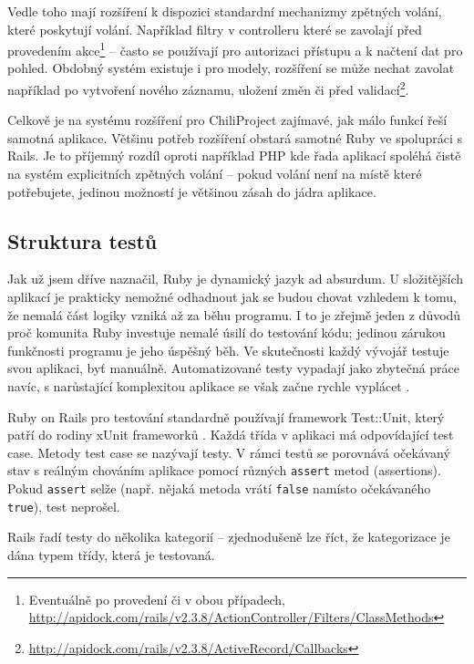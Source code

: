 \documentclass[thesis=B,czech]{FITthesis}[2012/05/02]
\begin{document}
Vedle toho mají rozšíření k dispozici standardní mechanizmy zpětných
volání, které poskytují volání. Například filtry v controlleru které se
zavolají před provedením akce\footnote{Eventuálně po provedení či v obou
  případech,
  \url{http://apidock.com/rails/v2.3.8/ActionController/Filters/ClassMethods}}
-- často se používají pro autorizaci přístupu a k načtení dat pro
pohled. Obdobný systém existuje i pro modely, rozšíření se může nechat
zavolat například po vytvoření nového záznamu, uložení změn či před
validací\footnote{\url{http://apidock.com/rails/v2.3.8/ActiveRecord/Callbacks}}.

Celkově je na systému rozšíření pro ChiliProject zajímavé, jak málo
funkcí řeší samotná aplikace. Většinu potřeb rozšíření obstará samotné
Ruby ve spolupráci s Rails. Je to příjemný rozdíl oproti například PHP
kde řada aplikací spoléhá čistě na systém explicitních zpětných volání
-- pokud volání není na místě které potřebujete, jedinou možností je
většinou zásah do jádra aplikace.

\subsection{Struktura testů}

\label{sec:rails_tests}

Jak už jsem dříve naznačil, Ruby je dynamický jazyk ad absurdum.
U složitějších aplikací je prakticky nemožné odhadnout jak se budou chovat
vzhledem k tomu, že nemalá část logiky vzniká až za běhu programu. I to
je zřejmě jeden z důvodů proč komunita Ruby investuje nemalé úsilí do
testování kódu; jedinou zárukou funkčnosti programu je jeho úspěšný běh.
Ve skutečnosti každý vývojář testuje svou aplikaci, byť manuálně.
Automatizované testy vypadají jako zbytečná práce navíc, s narůstající
komplexitou aplikace se však začne rychle vyplácet \citep{Rappin2011}.

Ruby on Rails pro testování standardně používají framework Test::Unit,
který patří do rodiny xUnit frameworků \citep{FowlerXunit}. Každá třída
v aplikaci má odpovídající test case. Metody test case se nazývají
testy. V rámci testů se porovnává očekávaný stav s reálným chováním
aplikace pomocí různých \lstinline!assert! metod (assertions). Pokud
\lstinline!assert! selže (např. nějaká metoda vrátí \lstinline!false!
namísto očekávaného \lstinline!true!), test neprošel.

Rails řadí testy do několika kategorií -- zjednodušeně lze říct, že
kategorizace je dána typem třídy, která je testovaná.
\end{document}
